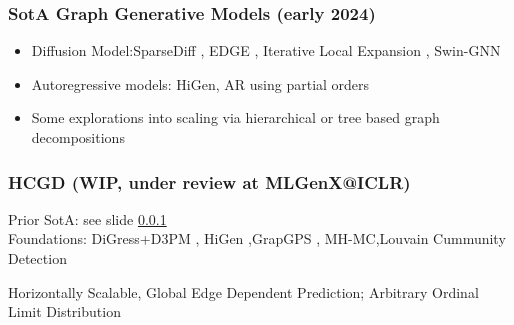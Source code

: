 \documentclass[./presentation.tex]{subfiles}
\begin{document}
\begin{frame}[t,label=hcgd]
  \frametitle{SotA Graph Generative Models (early 2024)}
  \label{frame:sota2023}
  \begin{itemize}
    \item Diffusion Model:SparseDiff \citep{qinSparseTrainingDiscrete2023e}, EDGE \citep{chenEfficientDegreeGuidedGraph2023g}, Iterative Local Expansion \citep{bergmeisterEfficientScalableGraph2024}, Swin-GNN \citep{yanSwinGNNRethinkingPermutation2023b}
    \item Autoregressive models: HiGen\citep{karamiHiGenHierarchicalGraph2023a}, AR using partial orders \citep{zhaoPardPermutationInvariantAutoregressive2024a}
    \item Some explorations into scaling via hierarchical \citep{daviesSizeMattersLarge2023c,lemaireSANGEAScalableAttributed2023} or tree based graph decompositions\citep{shirzadTDGENGraphGeneration2022a}
  \end{itemize}
\end{frame}
\begin{frame}[t,label=hcgd]
  \frametitle{HCGD (WIP, under review at MLGenX@ICLR)}
  \vspace{-1cm}
  \begin{priorart}
    Prior SotA: see slide \ref{frame:sota2023}\\%
    Foundations: DiGress+D3PM \citep{krawczukGGGANGeometricGraph2020,austinStructuredDenoisingDiffusion2021e}, HiGen \citep{karamiHiGenHierarchicalGraph2023a},GrapGPS \citep{rampasekRecipeGeneralPowerful2022b}, MH-MC\citep{metropolisEquationStateCalculations1953a},Louvain Cummunity Detection\citep{newmanFindingEvaluatingCommunity2004,blondelFastUnfoldingCommunities2008d}
  \end{priorart}
  \begin{contributions}
    Horizontally Scalable, Global Edge Dependent Prediction; Arbitrary Ordinal Limit Distribution
  \end{contributions}
\end{frame}
\end{document}
